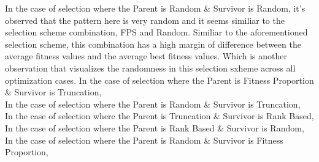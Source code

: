 \documentclass[11pt, letterpaper]{article}
\begin{document}
In the case of selection where the Parent is Random \& Survivor is Random, it's observed that the pattern here is very random and it seems similiar to the selection scheme combination, FPS and Random. Similiar to the aforementioned selection scheme, this combination has a high margin of difference between the average fitness values and the average best fitness values.  Which is another observation that visualizes the randomness in this selection sxheme across all optimization cases.  
In the case of selection where the Parent is Fitness Proportion \& Survivor is Truncation,\\
In the case of selection where the Parent is Random \& Survivor is Truncation,\\
In the case of selection where the Parent is Truncation \& Survivor is Rank Based,\\
In the case of selection where the Parent is Rank Based \& Survivor is Random,\\
In the case of selection where the Parent is Random \& Survivor is Fitness Proportion,\\ 
\end{document}

